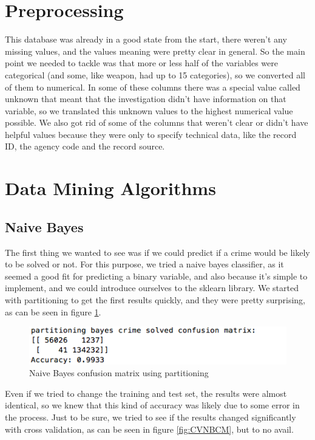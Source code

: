 \documentclass[12pt]{report}
\begin{document}
\section{Preprocessing}

This database was already in a good state from the start, there weren't any missing values, and the values meaning were pretty clear in general. So the main point we needed to tackle was that more or less half of the variables were categorical (and some, like weapon, had up to 15 categories), so we converted all of them to numerical. In some of these columns there was a special value called unknown that meant that the investigation didn't have information on that variable, so we translated this unknown values to the highest numerical value possible.
We also got rid of some of the columns that weren't clear or didn't have helpful values because they were only to specify technical data, like the record ID, the agency code and the record source.

\section{Data Mining Algorithms}

\subsection{Naive Bayes}

The first thing we wanted to see was if we could predict if a crime would be likely to be solved or not. For this purpose, we tried a naive bayes classifier, as it seemed a good fit for predicting a binary variable, and also because it's simple to implement, and we could introduce ourselves to the sklearn library.
We started with partitioning to get the first results quickly, and they were pretty surprising, as can be seen in figure 	 \ref{fig:PNBCM}.

\begin{figure}[h]
  \centering
  \includegraphics[width=0.5\linewidth]{../Images/PartitioningNaiveBayesCM}
  \caption{Naive Bayes confusion matrix using partitioning}
  \label{fig:PNBCM}
\end{figure}

Even if we tried to change the training and test set, the results were almost identical, so we knew that this kind of accuracy was likely due to some error in the process. Just to be sure, we tried to see if the results changed significantly with cross validation, as can be seen in figure \ref{fig:CVNBCM}, but to no avail.
\end{document}
